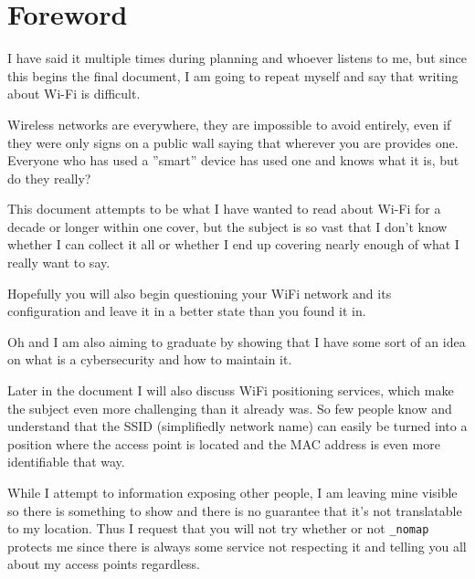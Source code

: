 \documentclass[../wifi-security.tex]{subfiles}
\begin{document}
\section{Foreword}

I have said it multiple times during planning and whoever listens to me, but since this begins the final document, I am going to repeat myself and say that writing about Wi-Fi is difficult.

Wireless networks are everywhere, they are impossible to avoid entirely, even if they were only signs on a public wall saying that wherever you are provides one. Everyone who has used a ''smart'' device has used one and knows what it is, but do they really?

This document attempts to be what I have wanted to read about Wi-Fi for a decade or longer within one cover, but the subject is so vast that I don't know whether I can collect it all or whether I end up covering nearly enough of what I really want to say.

Hopefully you will also begin questioning your WiFi network and its configuration and leave it in a better state than you found it in.

Oh and I am also aiming to graduate by showing that I have some sort of an idea on what is a cybersecurity and how to maintain it.

Later in the document I will also discuss WiFi positioning services, which make the subject even more challenging than it already was. So few people know and understand that the SSID (simplifiedly network name) can easily be turned into a position where the access point is located and the MAC address is even more identifiable that way.

While I attempt to  information exposing other people, I am leaving mine visible so there is something to show and there is no guarantee that it's not translatable to my location. Thus I request that you will not try whether or not \texttt{\_nomap} protects me since there is always some service not respecting it and telling you all about my access points regardless.
\end{document}
